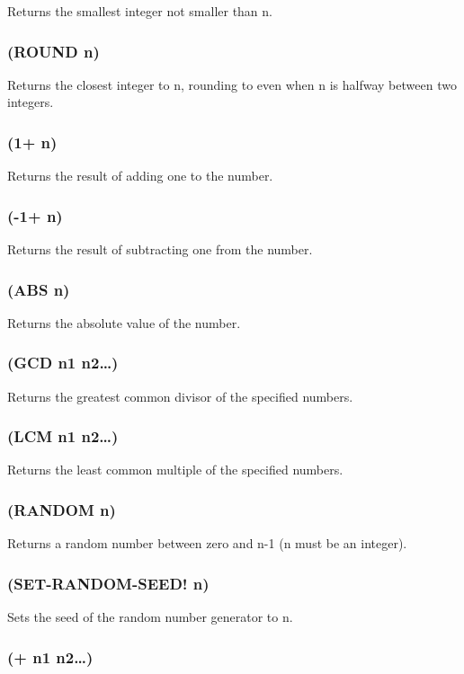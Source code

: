 \documentclass[11pt]{article}
\begin{document}
Returns the smallest integer not smaller than n.
\subsubsection{(ROUND n)}
\label{sec-4-25-12}

Returns the closest integer to n, rounding to even when n is halfway
between two integers.
\subsubsection{(1+ n)}
\label{sec-4-25-13}

Returns the result of adding one to the number.
\subsubsection{(-1+ n)}
\label{sec-4-25-14}

Returns the result of subtracting one from the number.
\subsubsection{(ABS n)}
\label{sec-4-25-15}

Returns the absolute value of the number.
\subsubsection{(GCD n1 n2\ldots{})}
\label{sec-4-25-16}

Returns the greatest common divisor of the specified numbers.
\subsubsection{(LCM n1 n2\ldots{})}
\label{sec-4-25-17}

Returns the least common multiple of the specified numbers.
\subsubsection{(RANDOM n)}
\label{sec-4-25-18}

Returns a random number between zero and n-1 (n must be an integer).
\subsubsection{(SET-RANDOM-SEED! n)}
\label{sec-4-25-19}

Sets the seed of the random number generator to n.
\subsubsection{(+ n1 n2\ldots{})}
\label{sec-4-25-20}
\end{document}
